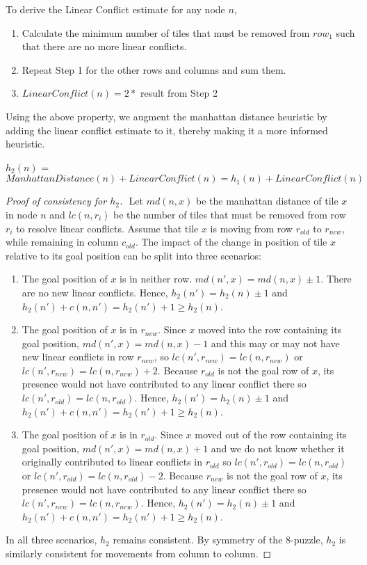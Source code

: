 \documentclass[11pt, a4paper]{article}
\begin{document}
To derive the Linear Conflict estimate for any node $n$,
\begin{enumerate}
	\item Calculate the minimum number of tiles that must be removed from $row_1$ such that there are no more linear conflicts.
	\item Repeat Step 1 for the other rows and columns and sum them.
	\item $LinearConflict(n) = 2 * $ result from Step 2
\end{enumerate}

Using the above property, we augment the manhattan distance heuristic by adding the linear conflict estimate to it, thereby making it a more informed heuristic.

\begin{center}
$h_2(n)$ = $ManhattanDistance(n) + LinearConflict(n) = h_1(n) + LinearConflict(n)$
\end{center}

\begin{proof}[Proof of consistency for $h_2$]
	$ $\newline
	Let $md(n, x)$ be the manhattan distance of tile $x$ in node $n$ and $lc(n, r_i)$ be the number of tiles that must be removed from row $r_i$ to resolve linear conflicts. 
	Assume that tile $x$ is moving from row $r_{old}$ to $r_{new}$, while remaining in column $c_{old}$. The impact of the change in position of tile $x$ relative to its goal position can be split into three scenarios:
	\begin{enumerate}
		\item The goal position of $x$ is in neither row. $md(n', x) = md(n, x) \pm 1$. There are no new linear conflicts. Hence, $h_2(n') = h_2(n) \pm 1$ and $h_2(n') + c(n, n') = h_2(n') + 1 \geq h_2(n)$.
		\item The goal position of $x$ is in $r_{new}$. Since $x$ moved into the row containing its goal position, $md(n', x) = md(n, x) - 1$ and this may or may not have new linear conflicts in row $r_{new}$, so $lc(n', r_{new}) = lc(n, r_{new})$ or $lc(n', r_{new}) = lc(n, r_{new}) + 2$. Because $r_{old}$ is not the goal row of $x$, its presence would not have contributed to any linear conflict there so $lc(n', r_{old}) = lc(n, r_{old})$. Hence, $h_2(n') = h_2(n) \pm 1$ and $h_2(n') + c(n, n') = h_2(n') + 1 \geq h_2(n)$.
		\item The goal position of $x$ is in $r_{old}$. Since $x$ moved out of the row containing its goal position, $md(n', x) = md(n, x) + 1$ and we do not know whether it originally contributed to linear conflicts in $r_{old}$ so $lc(n', r_{old}) = lc(n, r_{old})$ or $lc(n', r_{old}) = lc(n, r_{old}) - 2$. Because $r_{new}$ is not the goal row of $x$, its presence would not have contributed to any linear conflict there so $lc(n', r_{new}) = lc(n, r_{new})$. Hence, $h_2(n') = h_2(n) \pm 1$ and $h_2(n') + c(n, n') = h_2(n') + 1 \geq h_2(n)$.
	\end{enumerate}
	In all three scenarios, $h_2$ remains consistent. By symmetry of the 8-puzzle, $h_2$ is similarly consistent for movements from column to column. 
\end{proof}
\end{document}
